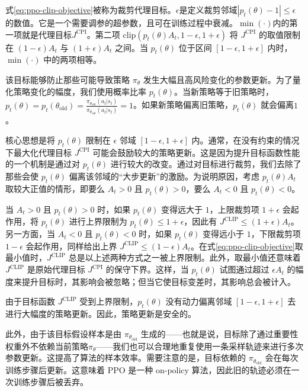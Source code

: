 \documentclass[lang=cn,newtx,10pt,scheme=chinese]{elegantbook}
\begin{document}
式\ref{eq:ppo-clip-objective}被称为裁剪代理目标。$\epsilon$是定义裁剪邻域$|p_t(\theta)-1|\leq\epsilon$的数值。它是一个需要调参的超参数，且可在训练过程中衰减。$\min(\cdot)$内的第一项就是代理目标$J^\text{CPI}$。第二项 $\text{clip}\left( p_t(\theta)A_t, 1-\epsilon, 1+\epsilon \right)$ 将 $J^\text{CPI}$ 的取值限制在 $(1-\epsilon)A_t$ 与 $(1+\epsilon)A_t$ 之间。当 $p_t(\theta)$ 位于区间 $[1-\epsilon,1+\epsilon]$ 内时，$\min(\cdot)$ 中的两项相等。

该目标能够防止那些可能导致策略 $\pi_\theta$ 发生大幅且高风险变化的参数更新。为了量化策略变化的幅度，我们使用概率比率 $p_t(\theta)$。当新策略等于旧策略时，$p_t(\theta)=p_t(\theta_\text{old})=\frac{\pi_{\theta_\text{old}}(a_t|s_t)}{\pi_{\theta_\text{old}}(a_t|s_t)}=1$。如果新策略偏离旧策略，$p_t(\theta)$ 就会偏离$1$。

核心思想是将 $p_t(\theta)$ 限制在 $\epsilon$ 邻域 $[1-\epsilon,1+\epsilon]$ 内。通常，在没有约束的情况下最大化代理目标 $J^\text{CPI}$ 可能会鼓励较大的策略更新。这是因为提升目标函数性能的一个机制是通过对 $p_t(\theta)$ 进行较大的改变。通过对目标进行裁剪，我们去除了那些会使 $p_t(\theta)$ 偏离该邻域的``大步更新''的激励。为说明原因，考虑 $p_t(\theta)A_t$ 取较大正值的情形，即要么 $A_t>0$ 且 $p_t(\theta)>0$，要么 $A_t<0$ 且 $p_t(\theta)<0$。

当 $A_t>0$ 且 $p_t(\theta)>0$ 时，如果 $p_t(\theta)$ 变得远大于 $1$，上限裁剪项 $1+\epsilon$ 会起作用，将 $p_t(\theta)$ 进行上界限制为 $p_t(\theta)\leq 1+\epsilon$，因此有 $J^{\text{CLIP}}\leq(1+\epsilon)A_t$。另一方面，当 $A_t<0$ 且 $p_t(\theta)<0$ 时，如果 $p_t(\theta)$ 变得远小于 $1$，下限裁剪项 $1-\epsilon$ 会起作用，同样给出上界 $J^{\text{CLIP}}\leq(1-\epsilon)A_t$。在式\ref{eq:ppo-clip-objective}取最小值时，$J^\text{CLIP}$ 总是以上述两种方式之一被上界限制。此外，取最小值还意味着 $J^\text{CLIP}$ 是原始代理目标 $J^\text{CPI}$ 的保守下界。这样，当 $p_t(\theta)$ 试图通过超过 $\epsilon A_t$ 的幅度来提升目标时，其影响会被忽略；但当它使目标变差时，其影响总会被计入。

由于目标函数 $J^\text{CLIP}$ 受到上界限制，$p_t(\theta)$ 没有动力偏离邻域 $[1-\epsilon,1+\epsilon]$ 去进行大幅度的策略更新。因此，策略更新是安全的。

此外，由于该目标假设样本是由 $\pi_{\theta_\text{old}}$ 生成的——也就是说，目标除了通过重要性权重外不依赖当前策略$\pi_\theta$——我们也可以合理地重复使用一条采样轨迹来进行多次参数更新。这提高了算法的样本效率。需要注意的是，目标依赖的 $\pi_{\theta_\text{old}}$ 会在每次训练步骤后更新。这意味着 PPO 是一种 on-policy 算法，因此旧的轨迹必须在一次训练步骤后被丢弃。
\end{document}
